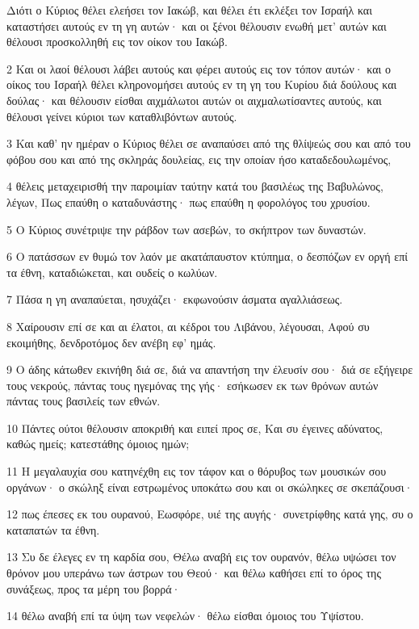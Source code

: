 \par Διότι ο Κύριος θέλει ελεήσει τον Ιακώβ, και θέλει έτι εκλέξει τον Ισραήλ και καταστήσει αυτούς εν τη γη αυτών· και οι ξένοι θέλουσιν ενωθή μετ' αυτών και θέλουσι προσκολληθή εις τον οίκον του Ιακώβ.
\par 2 Και οι λαοί θέλουσι λάβει αυτούς και φέρει αυτούς εις τον τόπον αυτών· και ο οίκος του Ισραήλ θέλει κληρονομήσει αυτούς εν τη γη του Κυρίου διά δούλους και δούλας· και θέλουσιν είσθαι αιχμάλωτοι αυτών οι αιχμαλωτίσαντες αυτούς, και θέλουσι γείνει κύριοι των καταθλιβόντων αυτούς.
\par 3 Και καθ' ην ημέραν ο Κύριος θέλει σε αναπαύσει από της θλίψεώς σου και από του φόβου σου και από της σκληράς δουλείας, εις την οποίαν ήσο καταδεδουλωμένος,
\par 4 θέλεις μεταχειρισθή την παροιμίαν ταύτην κατά του βασιλέως της Βαβυλώνος, λέγων, Πως επαύθη ο καταδυνάστης· πως επαύθη η φορολόγος του χρυσίου.
\par 5 Ο Κύριος συνέτριψε την ράβδον των ασεβών, το σκήπτρον των δυναστών.
\par 6 Ο πατάσσων εν θυμώ τον λαόν με ακατάπαυστον κτύπημα, ο δεσπόζων εν οργή επί τα έθνη, καταδιώκεται, και ουδείς ο κωλύων.
\par 7 Πάσα η γη αναπαύεται, ησυχάζει· εκφωνούσιν άσματα αγαλλιάσεως.
\par 8 Χαίρουσιν επί σε και αι έλατοι, αι κέδροι του Λιβάνου, λέγουσαι, Αφού συ εκοιμήθης, δενδροτόμος δεν ανέβη εφ' ημάς.
\par 9 Ο άδης κάτωθεν εκινήθη διά σε, διά να απαντήση την έλευσίν σου· διά σε εξήγειρε τους νεκρούς, πάντας τους ηγεμόνας της γής· εσήκωσεν εκ των θρόνων αυτών πάντας τους βασιλείς των εθνών.
\par 10 Πάντες ούτοι θέλουσιν αποκριθή και ειπεί προς σε, Και συ έγεινες αδύνατος, καθώς ημείς; κατεστάθης όμοιος ημών;
\par 11 Η μεγαλαυχία σου κατηνέχθη εις τον τάφον και ο θόρυβος των μουσικών σου οργάνων· ο σκώληξ είναι εστρωμένος υποκάτω σου και οι σκώληκες σε σκεπάζουσι·
\par 12 πως έπεσες εκ του ουρανού, Εωσφόρε, υιέ της αυγής· συνετρίφθης κατά γης, συ ο καταπατών τα έθνη.
\par 13 Συ δε έλεγες εν τη καρδία σου, Θέλω αναβή εις τον ουρανόν, θέλω υψώσει τον θρόνον μου υπεράνω των άστρων του Θεού· και θέλω καθήσει επί το όρος της συνάξεως, προς τα μέρη του βορρά·
\par 14 θέλω αναβή επί τα ύψη των νεφελών· θέλω είσθαι όμοιος του Υψίστου.
